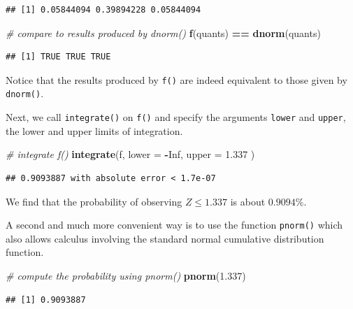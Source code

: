 \documentclass[]{book}
\newenvironment{Shaded}{\begin{snugshade}}{\end{snugshade}}
\newcommand{\KeywordTok}[1]{\textcolor[rgb]{0.13,0.29,0.53}{\textbf{#1}}}
\newcommand{\DataTypeTok}[1]{\textcolor[rgb]{0.13,0.29,0.53}{#1}}
\newcommand{\FloatTok}[1]{\textcolor[rgb]{0.00,0.00,0.81}{#1}}
\newcommand{\StringTok}[1]{\textcolor[rgb]{0.31,0.60,0.02}{#1}}
\newcommand{\CommentTok}[1]{\textcolor[rgb]{0.56,0.35,0.01}{\textit{#1}}}
\newcommand{\OtherTok}[1]{\textcolor[rgb]{0.56,0.35,0.01}{#1}}
\newcommand{\OperatorTok}[1]{\textcolor[rgb]{0.81,0.36,0.00}{\textbf{#1}}}
\newcommand{\NormalTok}[1]{#1}
\theoremstyle{definition}
\theoremstyle{definition}
\theoremstyle{definition}
\theoremstyle{remark}
\begin{document}
\begin{verbatim}
## [1] 0.05844094 0.39894228 0.05844094
\end{verbatim}

\begin{Shaded}
\begin{Highlighting}[]
\CommentTok{# compare to results produced by dnorm()}
\KeywordTok{f}\NormalTok{(quants) }\OperatorTok{==}\StringTok{ }\KeywordTok{dnorm}\NormalTok{(quants)}
\end{Highlighting}
\end{Shaded}

\begin{verbatim}
## [1] TRUE TRUE TRUE
\end{verbatim}

Notice that the results produced by \texttt{f()} are indeed equivalent
to those given by \texttt{dnorm()}.

Next, we call \texttt{integrate()} on \texttt{f()} and specify the
arguments \texttt{lower} and \texttt{upper}, the lower and upper limits
of integration.

\begin{Shaded}
\begin{Highlighting}[]
\CommentTok{# integrate f()}
\KeywordTok{integrate}\NormalTok{(f, }
          \DataTypeTok{lower =} \OperatorTok{-}\OtherTok{Inf}\NormalTok{, }
          \DataTypeTok{upper =} \FloatTok{1.337}
\NormalTok{          )}
\end{Highlighting}
\end{Shaded}

\begin{verbatim}
## 0.9093887 with absolute error < 1.7e-07
\end{verbatim}

We find that the probability of observing \(Z \leq 1.337\) is about
\(0.9094\%\).

A second and much more convenient way is to use the function
\texttt{pnorm()} which also allows calculus involving the standard
normal cumulative distribution function.

\begin{Shaded}
\begin{Highlighting}[]
\CommentTok{# compute the probability using pnorm()}
\KeywordTok{pnorm}\NormalTok{(}\FloatTok{1.337}\NormalTok{)}
\end{Highlighting}
\end{Shaded}

\begin{verbatim}
## [1] 0.9093887
\end{verbatim}
\end{document}
